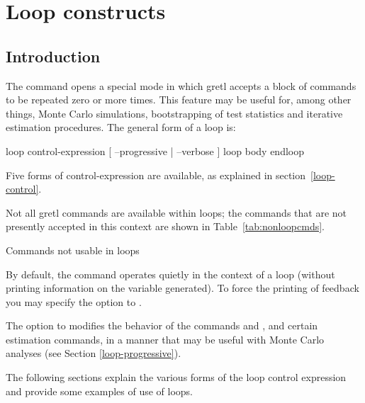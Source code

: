 \chapter{Loop constructs}
\label{chap:looping}

\section{Introduction}
\label{loop-intro}

The command  opens a special mode in which gretl
accepts a block of commands to be repeated zero or more times.  This
feature may be useful for, among other things, Monte Carlo simulations,
bootstrapping of test statistics and iterative estimation procedures.
The general form of a loop is:

\begin{code}
loop control-expression [ --progressive | --verbose ]
   loop body
endloop
\end{code}

Five forms of control-expression are available, as explained in
section~\ref{loop-control}.

Not all gretl commands are available within loops; the commands
that are not presently accepted in this context are shown in
Table~\ref{tab:nonloopcmds}.

\begin{table}[htbp]
\caption{Commands not usable in loops}
\label{tab:nonloopcmds}
\begin{center}

\end{center}
\end{table}

By default, the  command operates quietly in the context of
a loop (without printing information on the variable generated).  To
force the printing of feedback you may specify the 
option to .

The  option to  modifies the behavior of
the commands  and , and certain estimation
commands, in a manner that may be useful with Monte Carlo analyses
(see Section \ref{loop-progressive}).
    
The following sections explain the various forms of the loop control
expression and provide some examples of use of loops.  


